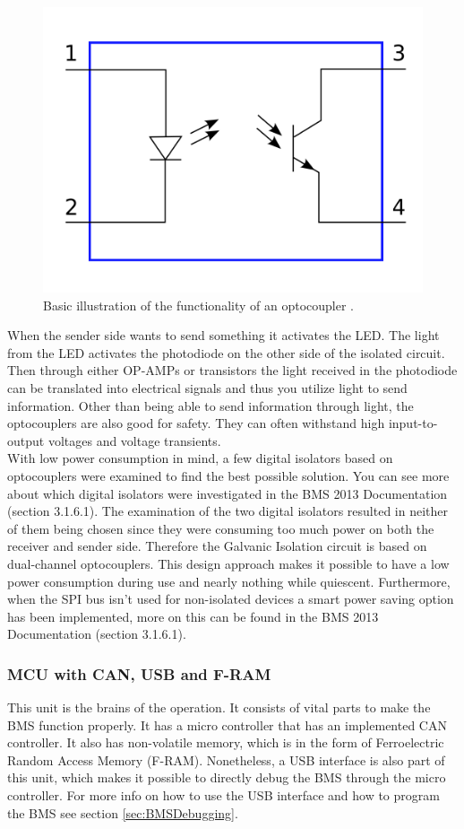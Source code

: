 \begin{figure}[H]
	\centering
	\includegraphics[width=0.5\linewidth]{Hardware/Pictures/BMSoptocoup}
	\caption[Empty]{Basic illustration of the functionality of an optocoupler \cite{OptoIllu}.}
	\label{fig:BMSoptocoup}
\end{figure}

When the sender side wants to send something it activates the LED. The light from the LED activates the photodiode on the other side of the isolated circuit. Then through either OP-AMPs or transistors the light received in the photodiode can be translated into electrical signals and thus you utilize light to send information. Other than being able to send information through light, the optocouplers are also good for safety. They can often withstand high input-to-output voltages and voltage transients. \\
With low power consumption in mind, a few digital isolators based on optocouplers were examined to find the best possible solution. You can see more about which digital isolators were investigated in the BMS 2013 Documentation \cite{BMSDocumentation} (section 3.1.6.1). The examination of the two digital isolators resulted in neither of them being chosen since they were consuming too much power on both the receiver and sender side. Therefore the Galvanic Isolation circuit is based on dual-channel optocouplers. This design approach makes it possible to have a low power consumption during use and nearly nothing while quiescent. Furthermore, when the SPI bus isn't used for non-isolated devices a smart power saving option has been implemented, more on this can be found in the BMS 2013 Documentation \cite{BMSDocumentation} (section 3.1.6.1).

\subsubsection{MCU with CAN, USB and F-RAM}
This unit is the brains of the operation. It consists of vital parts to make the BMS function properly. It has a micro controller that has an implemented CAN controller. It also has non-volatile memory, which is in the form of Ferroelectric Random Access Memory (F-RAM). Nonetheless, a USB interface is also part of this unit, which makes it possible to directly debug the BMS through the micro controller. For more info on how to use the USB interface and how to program the BMS see section \vref{sec:BMSDebugging}.

